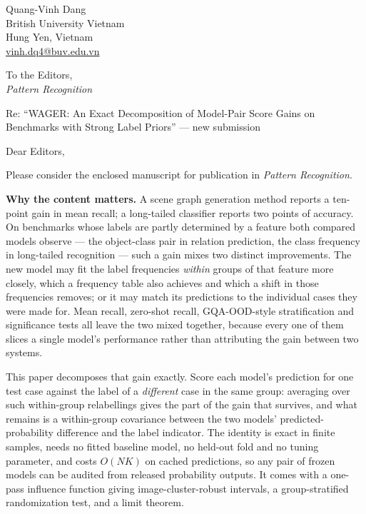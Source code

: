 \documentclass[11pt,a4paper]{article}
\begin{document}
\noindent
Quang-Vinh Dang\\
British University Vietnam\\
Hung Yen, Vietnam\\
\url{vinh.dq4@buv.edu.vn}

\vspace{1em}
\noindent
To the Editors,\\
\emph{Pattern Recognition}

\vspace{1em}

\noindent
Re: ``WAGER: An Exact Decomposition of Model-Pair Score Gains on Benchmarks with Strong
Label Priors'' --- new submission

\vspace{1em}

Dear Editors,

Please consider the enclosed manuscript for publication in \emph{Pattern Recognition}.

\textbf{Why the content matters.} A scene graph generation method reports a ten-point gain in
mean recall; a long-tailed classifier reports two points of accuracy. On benchmarks whose
labels are partly determined by a feature both compared models observe --- the object-class
pair in relation prediction, the class frequency in long-tailed recognition --- such a gain
mixes two distinct improvements. The new model may fit the label frequencies \emph{within}
groups of that feature more closely, which a frequency table also achieves and which a shift
in those frequencies removes; or it may match its predictions to the individual cases they
were made for. Mean recall, zero-shot recall, GQA-OOD-style stratification and significance
tests all leave the two mixed together, because every one of them slices a single model's
performance rather than attributing the gain between two systems.

This paper decomposes that gain exactly. Score each model's prediction for one test case
against the label of a \emph{different} case in the same group: averaging over such
within-group relabellings gives the part of the gain that survives, and what remains is a
within-group covariance between the two models' predicted-probability difference and the
label indicator. The identity is exact in finite samples, needs no fitted baseline model, no
held-out fold and no tuning parameter, and costs $O(NK)$ on cached predictions, so any pair
of frozen models can be audited from released probability outputs. It comes with a one-pass
influence function giving image-cluster-robust intervals, a group-stratified randomization
test, and a limit theorem.
\end{document}
